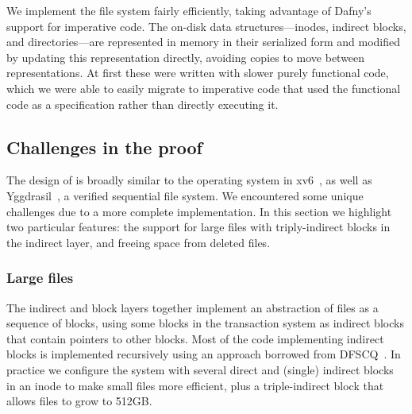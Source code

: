 We implement the file system fairly efficiently, taking advantage of Dafny's
support for imperative code. The on-disk data structures---inodes, indirect
blocks, and directories---are represented in memory in their serialized form and
modified by updating this representation directly, avoiding copies to move
between representations. At first these were written with slower purely
functional code, which we were able to easily migrate to imperative code that
used the functional code as a specification rather than directly executing it.

\subsection{Challenges in the proof}

The design of \sys is broadly similar to the operating system in xv6~\cite{xv6},
as well as Yggdrasil~\cite{sigurbjarnarson:yggdrasil}, a verified sequential
file system. We encountered some unique challenges due to a more complete
implementation. In this section we highlight two particular features: the
support for large files with triply-indirect blocks in the indirect layer, and
freeing space from deleted files.

\subsubsection{Large files}
\label{sec:dafny:indirect}

The indirect and block layers together implement an abstraction of
files as a sequence of blocks, using some blocks in the transaction
system as indirect blocks that contain pointers to other blocks.  Most
of the code implementing indirect blocks is implemented recursively
using an approach borrowed from DFSCQ~\cite{akonradi-meng}.
In practice we configure the system with several direct and (single)
indirect blocks in an inode to make small files more efficient, plus a
triple-indirect block that allows files to grow to 512GB.



